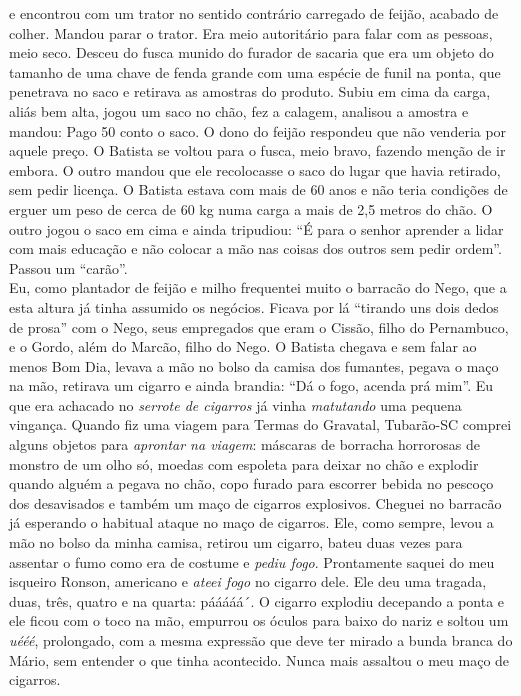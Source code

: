 \documentclass[12pt,brazil,]{book}
\begin{document}
e encontrou com um trator no sentido contrário carregado de feijão,
acabado de colher. Mandou parar o trator. Era meio autoritário para
falar com as pessoas, meio seco. Desceu do fusca munido do furador de
sacaria que era um objeto do tamanho de uma chave de fenda grande com
uma espécie de funil na ponta, que penetrava no saco e retirava as
amostras do produto. Subiu em cima da carga, aliás bem alta, jogou um
saco no chão, fez a calagem, analisou a amostra e mandou: Pago 50 conto
o saco. O dono do feijão respondeu que não venderia por aquele preço. O
Batista se voltou para o fusca, meio bravo, fazendo menção de ir embora.
O outro mandou que ele recolocasse o saco do lugar que havia retirado,
sem pedir licença. O Batista estava com mais de 60 anos e não teria
condições de erguer um peso de cerca de 60 kg numa carga a mais de 2,5
metros do chão. O outro jogou o saco em cima e ainda tripudiou: ``É para
o senhor aprender a lidar com mais educação e não colocar a mão nas
coisas dos outros sem pedir ordem''. Passou um ``carão''.\\
Eu, como plantador de feijão e milho frequentei muito o barracão do
Nego, que a esta altura já tinha assumido os negócios. Ficava por lá
``tirando uns dois dedos de prosa'' com o Nego, seus empregados que eram
o Cissão, filho do Pernambuco, e o Gordo, além do Marcão, filho do Nego.
O Batista chegava e sem falar ao menos Bom Dia, levava a mão no bolso da
camisa dos fumantes, pegava o maço na mão, retirava um cigarro e ainda
brandia: ``Dá o fogo, acenda prá mim''. Eu que era achacado no
\emph{serrote de cigarros} já vinha \emph{matutando} uma pequena
vingança. Quando fiz uma viagem para Termas do Gravatal, Tubarão-SC
comprei alguns objetos para \emph{aprontar na viagem}: máscaras de
borracha horrorosas de monstro de um olho só, moedas com espoleta para
deixar no chão e explodir quando alguém a pegava no chão, copo furado
para escorrer bebida no pescoço dos desavisados e também um maço de
cigarros explosivos. Cheguei no barracão já esperando o habitual ataque
no maço de cigarros. Ele, como sempre, levou a mão no bolso da minha
camisa, retirou um cigarro, bateu duas vezes para assentar o fumo como
era de costume e \emph{pediu fogo}. Prontamente saquei do meu isqueiro
Ronson, americano e \emph{ateei fogo} no cigarro dele. Ele deu uma
tragada, duas, três, quatro e na quarta: pááááá´. O cigarro explodiu
decepando a ponta e ele ficou com o toco na mão, empurrou os óculos para
baixo do nariz e soltou um \emph{uééé}, prolongado, com a mesma
expressão que deve ter mirado a bunda branca do Mário, sem entender o
que tinha acontecido. Nunca mais assaltou o meu maço de cigarros.
\end{document}

